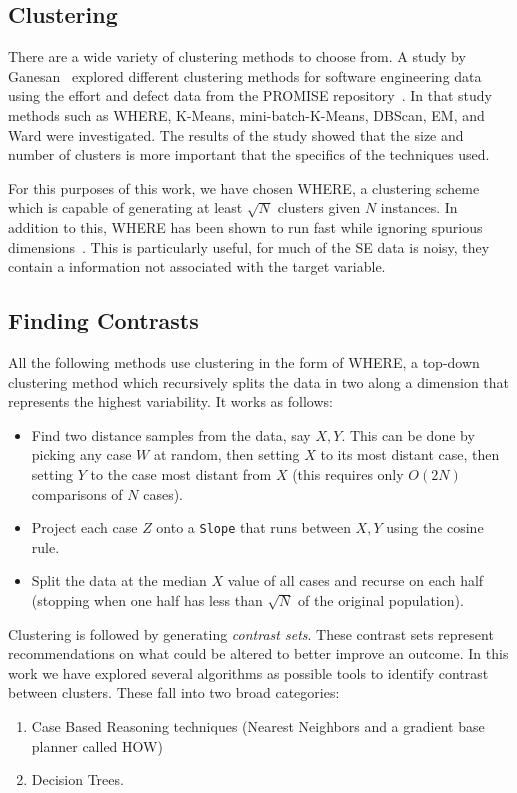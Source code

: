 \documentclass{sig-alternate}
\newcommand{\bi}{\begin{itemize}}
\newcommand{\ei}{\end{itemize}}
\begin{document}
\subsection{Clustering}
There are a wide variety of clustering methods to choose from. A study by Ganesan~\cite{div14} explored different clustering methods for software engineering data using the effort and defect data from the PROMISE repository~\cite{promise}. In that study methods such as WHERE, K-Means, mini-batch-K-Means, DBScan, EM, and Ward were investigated. The results of the study showed that the size and number of clusters is more important that the specifics of the techniques used. 

For this purposes of this work, we have chosen WHERE, a clustering scheme which is capable of generating at least $\sqrt{N}$ clusters given $N$ instances. In addition to this, WHERE has been shown to run fast while ignoring spurious dimensions~\cite{menzies2013}. This is particularly useful, for much of the SE data is noisy, they contain a information not associated with the target variable. 

\subsection{Finding Contrasts}
All the following methods use clustering in the form of WHERE, a top-down clustering method which recursively splits the data in two along a dimension that represents the highest variability. It works as follows:
\bi
\item Find   two   distance samples from the data, say  $X,Y$. This can be done by  picking any case $W$ at random, then setting $X$ to its most distant case, then setting $Y$ to the case most distant from $X$ (this requires only $O(2N)$ comparisons of $N$ cases).
\item Project each case $Z$ onto a {\tt Slope} that  runs between $X,Y$ using the cosine rule. 
\item Split the data at the median $X$ value of all cases and recurse on each half  (stopping when one half has less  than $\sqrt{N}$ of the original population).
\ei		

Clustering is followed by generating \textit{contrast sets}. These contrast sets represent recommendations on what could be altered to better improve an outcome. In this work we have explored several algorithms as possible tools to identify contrast between clusters. These fall into two broad categories:
\begin{enumerate}
\item Case Based Reasoning techniques (Nearest Neighbors and a gradient base planner called HOW)
\item Decision Trees.
\end{enumerate}
\end{document}

